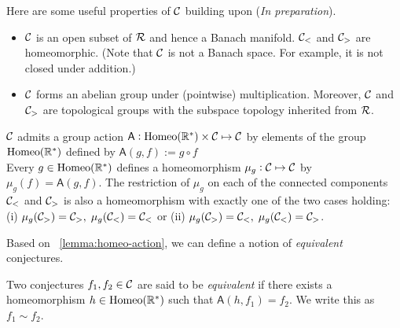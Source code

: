 Here are some useful properties of $\mathcal{C}$ building upon \cite{mishraConjGen2023} (\textit{In preparation}). 
\begin{itemize}
    \item $\mathcal{C}$ is an open subset of $\mathcal{R}$ and hence a Banach manifold. $\mathcal{C}_{<}$ and $\mathcal{C}_{>}$ are homeomorphic. (Note that $\mathcal{C}$ is not a Banach space. For example, it is not closed under addition.)
    \item $\mathcal{C}$ forms an abelian group under (pointwise) multiplication. Moreover, $\mathcal{C}$ and $\mathcal{C}_{>}$ are topological groups with the subspace topology inherited from $\mathcal{R}$. 
\end{itemize}

\begin{lemma}
    \label{lemma:homeo-action}
    $\mathcal{C}$ admits a group action $\mathsf{A}: \text{Homeo}(\mathbb{R}^*)\times\mathcal{C}\mapsto\mathcal{C}$ by elements of the group $\text{Homeo}(\mathbb{R}^*)$ defined by $\mathsf{A}(g,f) := g\circ f$\\
    Every $g\in\text{Homeo}(\mathbb{R}^*)$ defines a homeomorphism $\mu_g : \mathcal{C}\mapsto\mathcal{C}$ by $\mu_g(f) = \mathsf{A}(g,f)$. The restriction of $\mu_g$ on each of the connected components $\mathcal{C}_{<}$ and $\mathcal{C}_{>}$ is also a homeomorphism 
    with exactly one of the two cases holding: (i) $\mu_g(\mathcal{C}_{>}) = \mathcal{C}_{>},\; \mu_g(\mathcal{C}_{<}) = \mathcal{C}_{<}$ or (ii) $\mu_g(\mathcal{C}_{>}) = \mathcal{C}_{<},\; \mu_g(\mathcal{C}_{<}) = \mathcal{C}_{>}$.
\end{lemma}

Based on ~\ref{lemma:homeo-action}, we can define a notion of \textit{equivalent} conjectures.
\begin{definition}
    Two conjectures $f_1,f_2\in\mathcal{C}$ are said to be \textit{equivalent} if there exists a homeomorphism $h\in\text{Homeo}(\mathbb{R}^*)$ such that $\mathsf{A}(h, f_1) = f_2$. We write this as $f_1\sim f_2$.
\end{definition}    

